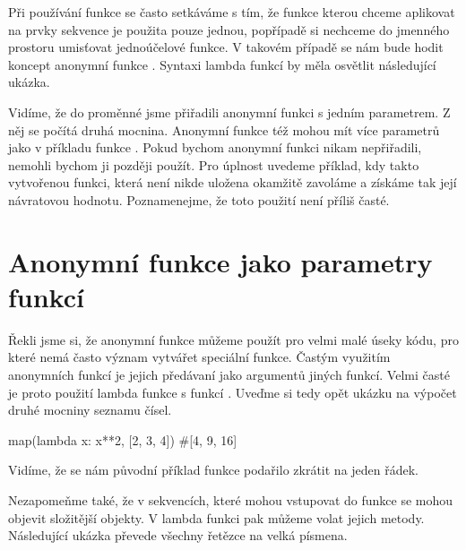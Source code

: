 Při používání funkce  se často setkáváme s tím, že funkce kterou chceme aplikovat na prvky
sekvence je použita pouze jednou, popřípadě si nechceme do jmenného prostoru umisťovat jednoúčelové
funkce. V takovém případě se nám bude hodit koncept anonymní funkce .
Syntaxi lambda funkcí by měla osvětlit následující ukázka.


Vidíme, že do proměnné  jsme přiřadili anonymní funkci s jedním parametrem. Z něj se počítá
druhá mocnina. Anonymní funkce též mohou mít více parametrů jako v příkladu funkce .
Pokud bychom anonymní funkci nikam nepřiřadili, nemohli bychom ji později použít.
Pro úplnost uvedeme příklad, kdy takto vytvořenou funkci, která není nikde uložena okamžitě
zavoláme a získáme tak její návratovou hodnotu. Poznamenejme, že toto použití není příliš časté.



\section{Anonymní funkce jako parametry funkcí}

Řekli jsme si, že anonymní funkce můžeme použít pro velmi malé úseky kódu, pro které nemá často význam
vytvářet speciální funkce. Častým využitím anonymních funkcí je jejich předávaní jako argumentů
jiných funkcí. Velmi časté je proto použití lambda funkce s funkcí . Uveďme si tedy opět
ukázku na výpočet druhé mocniny seznamu čísel.

\begin{python}
map(lambda x: x**2, [2, 3, 4]) #[4, 9, 16]
\end{python}

Vidíme, že se nám původní příklad funkce  podařilo zkrátit na jeden řádek.

Nezapomeňme také, že v sekvencích, které mohou vstupovat do funkce  se mohou objevit
složitější objekty. V lambda funkci pak můžeme volat jejich metody. Následující ukázka převede
všechny řetězce na velká písmena.

